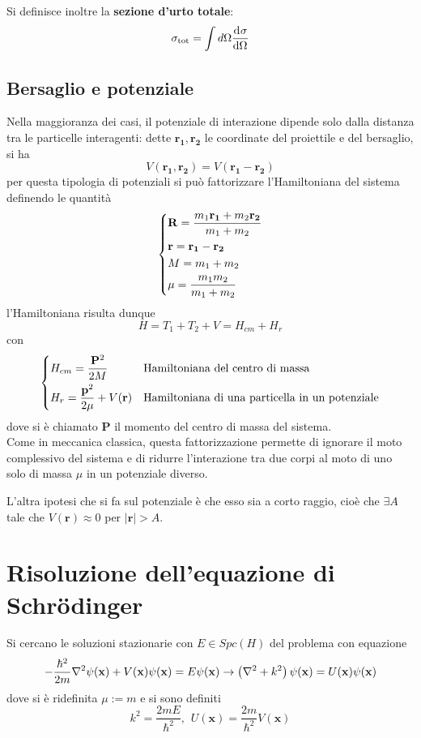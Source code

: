Si definisce inoltre la \textbf{sezione d'urto totale}:
$$\sigma_\text{tot} = \int d\Omega \dv[]{\sigma}{\Omega}$$
\subsection{Bersaglio e potenziale}
Nella maggioranza dei casi, il potenziale di interazione dipende solo dalla distanza tra le particelle
interagenti: dette $\mathbf{r_1},\mathbf{r_2}$ le coordinate del proiettile e del bersaglio, si ha
$$V(\mathbf{r_1},\mathbf{r_2}) = V(\mathbf{r_1}-\mathbf{r_2})$$
per questa tipologia di potenziali si può fattorizzare l'Hamiltoniana del sistema definendo le
quantità
$$\begin{dcases}
    \mathbf{R} = \frac{m_1\mathbf{r_1}+m_2\mathbf{r_2}}{m_1+m_2}\\
    \mathbf{r} = \mathbf{r_1}-\mathbf{r_2}\\
    M = m_1+m_2\\
    \mu = \frac{m_1m_2}{m_1+m_2}
\end{dcases}$$
l'Hamiltoniana risulta dunque
$$H = T_1 + T_2 + V = H_{cm} + H_r$$
con
$$
\begin{dcases}
    H_{cm} = \frac{\mathbf{P}^2}{2M}&\text{Hamiltoniana del centro di massa}\\
    H_r = \frac{\mathbf{p}^2}{2\mu} + V(\mathbf{r})&\text{Hamiltoniana di una particella in un
    potenziale}
\end{dcases}
$$
dove si è chiamato $\mathbf{P}$ il momento del centro di massa del sistema.\\
Come in meccanica classica, questa fattorizzazione permette di ignorare il moto complessivo del
sistema e di ridurre l'interazione tra due corpi al moto di uno solo di massa $\mu$ in un potenziale diverso.

L'altra ipotesi che si fa sul potenziale è che esso sia a corto raggio, cioè che $\exists A$ tale che
$V(\mathbf{r})\approx0$ per $|\mathbf{r}|>A$.
\section{Risoluzione dell'equazione di Schrödinger}
Si cercano le soluzioni stazionarie con $E\in Spc(H)$ del problema con equazione
$$-\frac{\hbar^2}{2m}\laplacian\psi(\mathbf{x})+V(\mathbf{x})\psi(\mathbf{x})=E\psi(\mathbf{x})
\rightarrow\left(\laplacian + k^2\right)\psi(\mathbf{x})=U(\mathbf{x})\psi(\mathbf{x})$$
dove si è ridefinita $\mu:=m$ e si sono definiti
$$k^2 = \frac{2mE}{\hbar^2}\text{,}\phantom{x}U(\mathbf{x})=\frac{2m}{\hbar^2}V(\mathbf{x})$$

